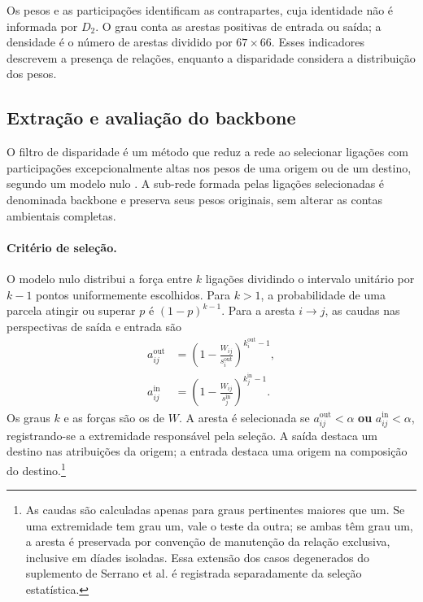 Os pesos e as participações identificam as contrapartes, cuja identidade não é informada por $D_2$. O grau conta as arestas positivas de entrada ou saída; a densidade é o número de arestas dividido por $67\times66$. Esses indicadores descrevem a presença de relações, enquanto a disparidade considera a distribuição dos pesos.

\subsection{Extração e avaliação do backbone}
\label{sec:backbone}

O filtro de disparidade é um método que reduz a rede ao selecionar ligações com participações excepcionalmente altas nos pesos de uma origem ou de um destino, segundo um modelo nulo \parencite{serrano2009,huang2019}. A sub-rede formada pelas ligações selecionadas é denominada backbone e preserva seus pesos originais, sem alterar as contas ambientais completas.

\paragraph{Critério de seleção.}
O modelo nulo distribui a força entre $k$ ligações dividindo o intervalo unitário por $k-1$ pontos uniformemente escolhidos. Para $k>1$, a probabilidade de uma parcela atingir ou superar $p$ é $(1-p)^{k-1}$. Para a aresta $i\rightarrow j$, as caudas nas perspectivas de saída e entrada são
\begin{equation}
\begin{aligned}
a_{ij}^{\mathrm{out}}&=\left(1-\frac{W_{ij}}{s_i^{\mathrm{out}}}\right)^{k_i^{\mathrm{out}}-1},\\
a_{ij}^{\mathrm{in}}&=\left(1-\frac{W_{ij}}{s_j^{\mathrm{in}}}\right)^{k_j^{\mathrm{in}}-1}.
\end{aligned}
\label{eq:caudas-filtro}
\end{equation}
Os graus $k$ e as forças são os de $W$. A aresta é selecionada se $a_{ij}^{\mathrm{out}}<\alpha$ \textbf{ou} $a_{ij}^{\mathrm{in}}<\alpha$, registrando-se a extremidade responsável pela seleção. A saída destaca um destino nas atribuições da origem; a entrada destaca uma origem na composição do destino.\footnote{As caudas são calculadas apenas para graus pertinentes maiores que um. Se uma extremidade tem grau um, vale o teste da outra; se ambas têm grau um, a aresta é preservada por convenção de manutenção da relação exclusiva, inclusive em díades isoladas. Essa extensão dos casos degenerados do suplemento de Serrano et al. é registrada separadamente da seleção estatística.}

